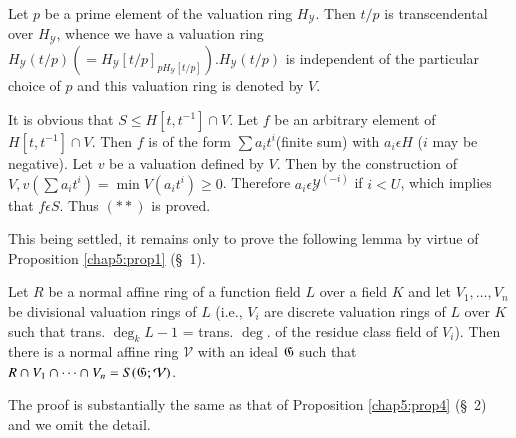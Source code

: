 Let $p$ be a prime element of the valuation ring
$H_{\mathscr{Y}}$.  Then $t/p$ is transcendental over
$H_{\mathscr{Y}}$, whence we have a valuation ring
$H_{\mathscr{Y}}(t/p)( =
H_{\mathscr{Y}}[t/p]_{pH_{\mathscr{Y}}[t/p]}).H_{\mathscr{Y}}(t/p)$ 
is independent of the particular choice of $p$ and this valuation ring
is denoted by $V$. 

It is obvious that $S \leq H [t,t^{-1}] \cap V$.  Let $f$ be an
arbitrary element of  $H [t,t^{-1}] \cap V$.  Then $f$ is of the form
$\sum a_i t^i$\pageoriginale (finite sum) with $a_i \epsilon H$ ($i$
may be negative). Let $v$ be a valuation defined by $V$. Then by the
construction of 
$V, v(\sum a_i t^i) = \min V(a_i t^i) \geq 0$. Therefore  $a_i
\epsilon \mathscr{Y} ^{(-i)}$ if $i< U$, which implies that $f
\epsilon S$. Thus $(\ast \ast)$ is proved. 
	
This being settled, it remains only to prove the following lemma by
virtue of Proposition \ref{chap5:prop1} (\S\ 1). 

\begin{lemma*}
  Let $R$ be a normal affine ring of a function field $L$ over a field
  $K$ and let $V_1, \ldots, V_n$ be divisional valuation rings of $L$
  (i.e., $V_i$ are discrete valuation rings of $L$ over $K$ such that
  trans.  $\deg_{k} L-1$ = trans.  $\deg$. of the residue  class field
  of $V_i$).  Then there is a normal affine ring $\mathcal{V}$ with an
  ideal $\mathfrak{G}$ such that $R \cap V_1 \cap \cdots \cap V_n = S
  (\mathfrak{G} ; \mathcal{V})$. 
\end{lemma*}

The proof is substantially the same as that of Proposition
\ref{chap5:prop4} (\S\ 2) and we omit the detail.  
